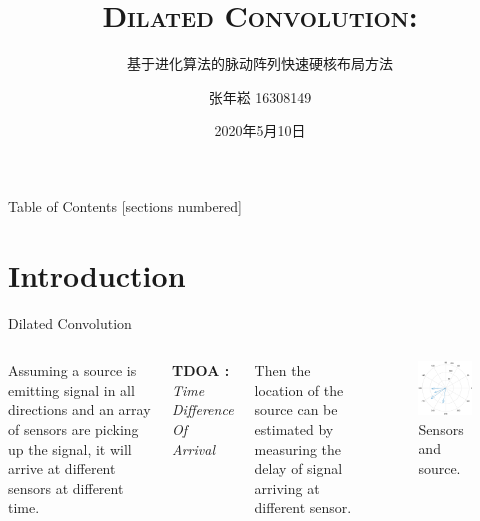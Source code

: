\documentclass[10pt]{beamer}
\title{\textsc{Dilated Convolution}:}
\subtitle{基于进化算法的脉动阵列快速硬核布局方法}
\date{2020年5月10日}
\author{张年崧 16308149}
\institute{School of Electronics and Information Technology, Sun Yat-sen University}
\begin{document}
\maketitle

\begin{frame}{Table of Contents}
  [sections numbered]
  \tableofcontents[hideallsubsections]
\end{frame}


\section{Introduction}

\begin{frame}{Dilated Convolution}
  \begin{columns}[T,onlytextwidth]
      Assuming a source is emitting signal in all directions and an array of
      sensors are picking up the signal, it will arrive at different sensors at
      different time.

      \begin{center}
        \textbf{TDOA :} \textit{Time Difference Of Arrival}
      \end{center}

      Then the location of the source can be estimated by measuring the delay of
      signal arriving at different sensor.

      \begin{figure}
        \includegraphics[width=1\textwidth]{img/intro.png}
        \caption{Sensors and source.}
      \end{figure}
  \end{columns}
\end{frame}
\end{document}
